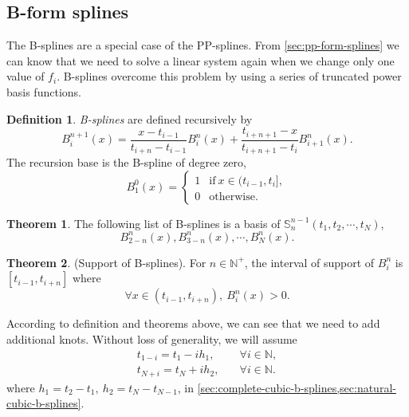 \documentclass[a4paper]{article}
\theoremstyle{definition}
\newtheorem{definition}{Definition}
\newtheorem{theorem}{Theorem}
\begin{document}
\subsection{B-form splines}

The B-splines are a special case of the PP-splines. From \cref{sec:pp-form-splines} we can know that we need to solve a linear system again when we change only one value of $f_i$. B-splines overcome this problem by using a series of truncated power basis functions.

\begin{definition}
  \textit{B-splines} are defined recursively by 
  \begin{equation}
    B_i^{n + 1}(x) = \frac{x - t_{i- 1}}{t_{i + n} - t_{i - 1}}B_i^n(x) + \frac{t_{i + n + 1} - x}{t_{i + n + 1} - t_i}B_{i + 1}^n(x).
    \label{eq:b-spline-recursive}
  \end{equation}
  The recursion base is the B-spline of degree zero,
  \begin{equation}
    B_1^0(x) = \begin{cases}
      1 & \text{if}\ x \in (t_{i - 1}, t_i], \\
      0 & \text{otherwise}.
    \end{cases}
  \end{equation}
\end{definition}

\begin{theorem}
  The following list of B-splines is a basis of $\mathbb{S}_n^{n - 1}(t_1, t_2, \cdots, t_N)$,
  \begin{equation}
    B_{2 - n}^n(x), B_{3 - n}^n(x), \cdots, B_{N}^n(x).
    \label{eq:b-spline-basis}
  \end{equation}
\end{theorem}

\begin{theorem}
  (Support of B-splines). For $n \in \mathbb{N}^+$, the interval of support of $B_i^n$ is $[t_{i - 1}, t_{i + n}]$ where 
  \begin{equation}
    \forall x \in (t_{i - 1}, t_{i + n}),\ B_i^n(x) > 0.
    \label{eq:b-spline-support}
  \end{equation}
  \label{thm:b-spline-support}
\end{theorem}

According to definition and theorems above, we can see that we need to add additional knots. Without loss of generality, we will assume 
\begin{equation}
  \begin{aligned}
    t_{1 - i} = t_1 - ih_1,& \quad \forall i \in \mathbb{N}, \\
    t_{N + i} = t_N + ih_2,& \quad \forall i \in \mathbb{N}.
  \end{aligned}
  \label{eq:cubic-b-spline-knots}
\end{equation}
where $h_1 = t_2 - t_1,\ h_2 = t_N - t_{N - 1}$, in \cref{sec:complete-cubic-b-splines,sec:natural-cubic-b-splines}.
\end{document}
